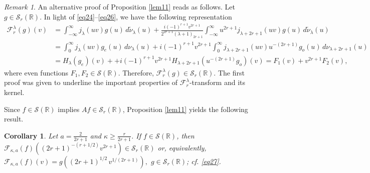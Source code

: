 \documentclass[12pt,twoside,reqno]{amsart}\usepackage[cp1251]{inputenc}
\theoremstyle{plain}
\newtheorem{corollary}[theorem]{Corollary}
\theoremstyle{remark}
\newtheorem{remark}[theorem]{Remark}
\begin{document}
\begin{remark}%
An alternative proof of Proposition  \ref{lem11} reads as follows.
Let $g\in\mathcal{S}_{r}(\mathbb{R})$. In light of \eqref{eq24}--\eqref{eq26}, we have the following representation
\begin{align*}
\mathcal{F}_{r}^{\lambda}(g)(v)&=\int_{-\infty}^{\infty}j_{\lambda}(uv)g(u)\,d\widetilde{\nu}_{\lambda}(u)+
\frac{i(-1)^{r+1}v^{2r+1}}{2^{2r+1}(\lambda+1)_{2r+1}}\int_{-\infty}^{\infty}u^{2r+1}j_{\lambda+2r+1}(uv)g(u)\,d\widetilde{\nu}_{\lambda}(u)\\
&=\int_{0}^{\infty}j_{\lambda}(uv)g_{e}(u)\,d\nu_{\lambda}(u)+i(-1)^{r+1}v^{2r+1}\int_{0}^{\infty}j_{\lambda+2r+1}(uv)u^{-(2r+1)}g_{o}(u)
\,d\nu_{\lambda+2r+1}(u)\\
&=H_{\lambda}(g_e)(v)++i(-1)^{r+1}v^{2r+1}H_{\lambda+2r+1}(u^{-(2r+1)}g_o)(v)
=F_1(v)+v^{2r+1}F_2(v),
\end{align*}
where even functions $F_1,F_2\in\mathcal{S}(\mathbb{R})$. Therefore, $\mathcal{F}_{r}^{\lambda}(g)\in\mathcal{S}_{r}(\mathbb{R})$. %
The first  proof was given to underline the important properties of $\mathcal{F}_{r}^{\lambda}$-transform and its kernel.
\end{remark}


Since $f\in\mathcal{S}(\mathbb{R})$ implies $Af\in \mathcal{S}_r(\mathbb{R})$, Proposition \ref{lem11} yields the following result.

\begin{corollary}%
Let $a=\frac{2}{2r+1}$ and $\kappa\ge\frac{r}{2r+1}$. %
If $f\in\mathcal{S}(\mathbb{R})$, then $\mathcal{F}_{\kappa,a}(f)((2r+1)^{-(r+1/2)} v^{2r+1})\in\mathcal{S}_r(\mathbb{R})$ or, equivalently,
$\mathcal{F}_{\kappa,a}(f)(v)=g((2r+1)^{1/2}\,v^{1/(2r+1)}),$ $g\in\mathcal{S}_r(\mathbb{R})$; cf. \eqref{eq27}.
\end{corollary}
\end{document}
